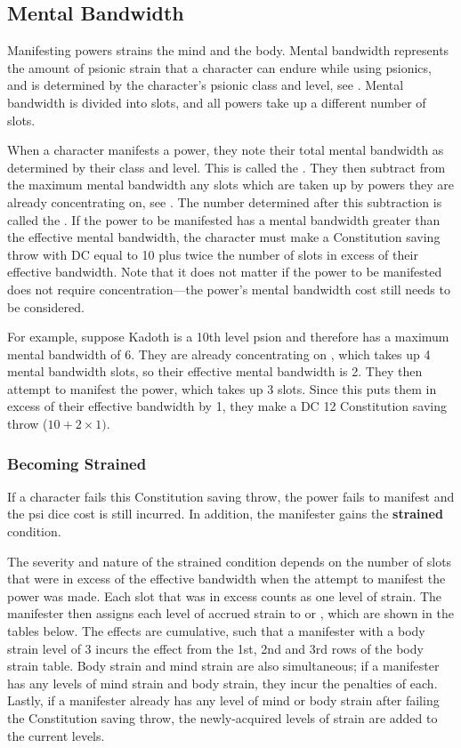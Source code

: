\subsection{Mental Bandwidth}
Manifesting powers strains the mind and the body.
Mental bandwidth represents the amount of psionic strain that
a character can endure while using psionics,
and is determined by the character's psionic class and level,
see .
Mental bandwidth is divided into slots,
and all powers take up a different number of slots.

When a character manifests a power,
they note their total mental bandwidth
as determined by their class and level.
This is called the
.
They then subtract from the maximum mental bandwidth
any slots which are taken up by powers they are already concentrating on,
see .
The number determined after this subtraction is called the
.
If the power to be manifested has a mental bandwidth
greater than the effective mental bandwidth,
the character must make a Constitution saving throw with
DC equal to 10 plus twice the number of slots
in excess of their effective bandwidth.
Note that it does not matter if the power to be manifested
does not require concentration---the power's mental bandwidth cost
still needs to be considered.

For example,
suppose Kadoth is a 10th level psion
and therefore has a maximum mental bandwidth of 6.
They are already concentrating on ,
which takes up 4 mental bandwidth slots,
so their effective mental bandwidth is 2.
They then attempt to manifest the  power,
which takes up 3 slots.
Since this puts them in excess of their effective bandwidth by 1,
they make a DC 12 Constitution saving throw ($10 + 2 \times 1)$.

\subsubsection{Becoming Strained}
If a character fails this Constitution saving throw,
the power fails to manifest
and the psi dice cost is still incurred.
In addition, the manifester gains the \textbf{strained} condition.

The severity and nature of the strained condition depends on the number of slots
that were in excess of the effective bandwidth when the attempt
to manifest the power was made.
Each slot that was in excess counts as one level of strain.
The manifester then assigns each level of accrued strain
to  or ,
which are shown in the tables below.
The effects are cumulative,
such that a manifester with a body strain level of 3
incurs the effect from the 1st, 2nd and 3rd rows of the
body strain table.
Body strain and mind strain are also simultaneous;
if a manifester has any levels of mind strain and body strain,
they incur the penalties of each.
Lastly,
if a manifester already has any level of mind or body strain
after failing the Constitution saving throw,
the newly-acquired levels of strain are added to the current levels.

